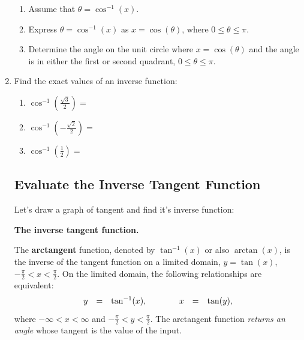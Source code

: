 \begin{enumerate}
{{     \begin{enumerate}
     \item Assume that $\theta = \cos^{-1}(x)$.
     \item Express $\theta = \cos^{-1}(x)$ as $x=\cos(\theta)$, where
       $0 \leq \theta \leq \pi$.
     \item Determine the angle on the unit circle where
       $x=\cos(\theta)$ and the angle is in either the first or second
       quadrant, $0 \leq \theta \leq \pi$.
     \end{enumerate}

   }
 }




\vspace{-.1in}
\item Find the exact values of an inverse function:
 \begin{enumerate}
\item $\displaystyle \cos^{-1}\left(\frac{\sqrt{3}}{2}\right)=$\\[10pt]

\item $\displaystyle \cos^{-1}\left(-\frac{\sqrt{2}}{2}\right)=$\\[10pt]

\item $\displaystyle \cos^{-1}\left(\frac{1}{2}\right)=$\\[10pt]

\end{enumerate}




\subsection{Evaluate the Inverse Tangent Function}

Let's draw a graph of tangent and find it's inverse function:
\vfill

   \noindent\colorbox{blue!10}{%
   \parbox{\dimexpr\linewidth}%
   {%
     \textbf{The inverse tangent function.}

     The \textbf{arctangent} function, denoted by $\tan^{-1}(x)$ or also
     $\arctan(x)$, is the inverse of the tangent function on a limited
     domain, $y=\tan(x)$, $-\frac{\pi}{2} < x <
     \frac{\pi}{2}$. On the limited domain, the following
     relationships are equivalent:
     \begin{eqnarray*}
       \begin{array}{rcl@{\hspace{4em}}rcl}
         y & = & \tan^{-1}(x), & x & = & \tan(y),
       \end{array}
     \end{eqnarray*}
     where $-\infty < x < \infty$ and $-\frac{\pi}{2} < y <
     \frac{\pi}{2}$. The arctangent function \textit{returns an angle}
     whose tangent is the value of the input.

}}
\end{enumerate}

